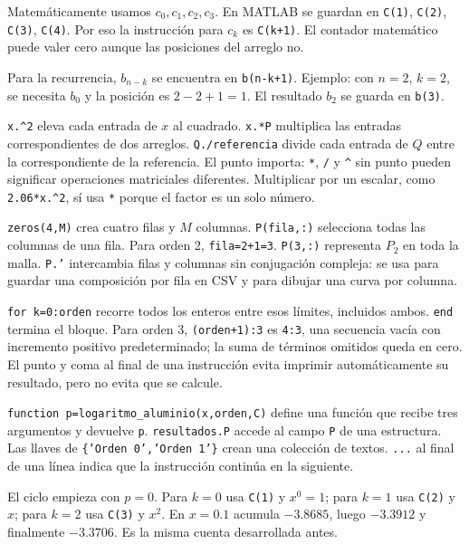 Matemáticamente usamos $c_0,c_1,c_2,c_3$. En MATLAB se guardan en \texttt{C(1)}, \texttt{C(2)}, \texttt{C(3)}, \texttt{C(4)}. Por eso la instrucción para $c_k$ es \texttt{C(k+1)}. El contador matemático puede valer cero aunque las posiciones del arreglo no.

Para la recurrencia, $b_{n-k}$ se encuentra en \texttt{b(n-k+1)}. Ejemplo: con $n=2$, $k=2$, se necesita $b_0$ y la posición es $2-2+1=1$. El resultado $b_2$ se guarda en \texttt{b(3)}.

\texttt{x.\^{}2} eleva cada entrada de $x$ al cuadrado. \texttt{x.*P} multiplica las entradas correspondientes de dos arreglos. \texttt{Q./referencia} divide cada entrada de $Q$ entre la correspondiente de la referencia. El punto importa: \texttt{*}, \texttt{/} y \texttt{\^{}} sin punto pueden significar operaciones matriciales diferentes. Multiplicar por un escalar, como \texttt{2.06*x.\^{}2}, sí usa \texttt{*} porque el factor es un solo número.

\texttt{zeros(4,M)} crea cuatro filas y $M$ columnas. \texttt{P(fila,:)} selecciona todas las columnas de una fila. Para orden 2, \texttt{fila=2+1=3}. \texttt{P(3,:)} representa $P_2$ en toda la malla. \texttt{P.'} intercambia filas y columnas sin conjugación compleja: se usa para guardar una composición por fila en CSV y para dibujar una curva por columna.

\texttt{for k=0:orden} recorre todos los enteros entre esos límites, incluidos ambos. \texttt{end} termina el bloque. Para orden 3, \texttt{(orden+1):3} es \texttt{4:3}, una secuencia vacía con incremento positivo predeterminado; la suma de términos omitidos queda en cero. El punto y coma al final de una instrucción evita imprimir automáticamente su resultado, pero no evita que se calcule.

\texttt{function p=logaritmo\_aluminio(x,orden,C)} define una función que recibe tres argumentos y devuelve \texttt{p}. \texttt{resultados.P} accede al campo \texttt{P} de una estructura. Las llaves de \texttt{\{'Orden 0','Orden 1'\}} crean una colección de textos. \texttt{...} al final de una línea indica que la instrucción continúa en la siguiente.

El ciclo empieza con $p=0$. Para $k=0$ usa \texttt{C(1)} y $x^0=1$; para $k=1$ usa \texttt{C(2)} y $x$; para $k=2$ usa \texttt{C(3)} y $x^2$. En $x=0.1$ acumula $-3.8685$, luego $-3.3912$ y finalmente $-3.3706$. Es la misma cuenta desarrollada antes.


